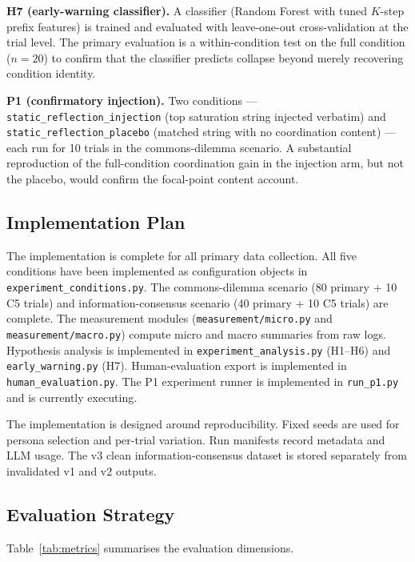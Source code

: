 \documentclass[11pt]{article}
\begin{document}
\textbf{H7 (early-warning classifier).} A classifier (Random Forest with tuned $K$-step prefix features) is trained and evaluated with leave-one-out cross-validation at the trial level. The primary evaluation is a within-condition test on the full condition ($n = 20$) to confirm that the classifier predicts collapse beyond merely recovering condition identity.

\textbf{P1 (confirmatory injection).} Two conditions --- \texttt{static\_reflection\_injection} (top saturation string injected verbatim) and \texttt{static\_reflection\_placebo} (matched string with no coordination content) --- each run for 10 trials in the commons-dilemma scenario. A substantial reproduction of the full-condition coordination gain in the injection arm, but not the placebo, would confirm the focal-point content account.

\subsection{Implementation Plan}
The implementation is complete for all primary data collection. All five conditions have been implemented as configuration objects in \texttt{experiment\_conditions.py}. The commons-dilemma scenario (80 primary + 10 C5 trials) and information-consensus scenario (40 primary + 10 C5 trials) are complete. The measurement modules (\texttt{measurement/micro.py} and \texttt{measurement/macro.py}) compute micro and macro summaries from raw logs. Hypothesis analysis is implemented in \texttt{experiment\_analysis.py} (H1--H6) and \texttt{early\_warning.py} (H7). Human-evaluation export is implemented in \texttt{human\_evaluation.py}. The P1 experiment runner is implemented in \texttt{run\_p1.py} and is currently executing.

The implementation is designed around reproducibility. Fixed seeds are used for persona selection and per-trial variation. Run manifests record metadata and LLM usage. The v3 clean information-consensus dataset is stored separately from invalidated v1 and v2 outputs.

\subsection{Evaluation Strategy}
Table~\ref{tab:metrics} summarises the evaluation dimensions.
\end{document}
